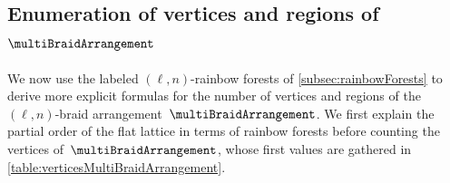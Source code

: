 \documentclass{amsart}
\theoremstyle{definition}
\begin{document}

\subsection{Enumeration of vertices and regions of $\multiBraidArrangement$}
\label{subsec:verticesFacetsMultiBraidArrangement}

We now use the labeled $(\ell,n)$-rainbow forests of \cref{subsec:rainbowForests} to derive more explicit formulas for the number of vertices and regions of the $(\ell,n)$-braid arrangement~$\multiBraidArrangement$.
We first explain the partial order of the flat lattice in terms of rainbow forests before counting the vertices of~$\multiBraidArrangement$, whose first values are gathered in \cref{table:verticesMultiBraidArrangement}.

\begin{table}
	\centerline{}
	\vspace{.3cm}
	\caption{The numbers $f_0(\multiBraidArrangement) = \ell \big( (\ell-1) n + 1 \big)^{n-2}$ of vertices of~$\multiBraidArrangement$ for~$\ell,n \in [8]$.}
	\label{table:verticesMultiBraidArrangement}
\end{table}
\end{document}
